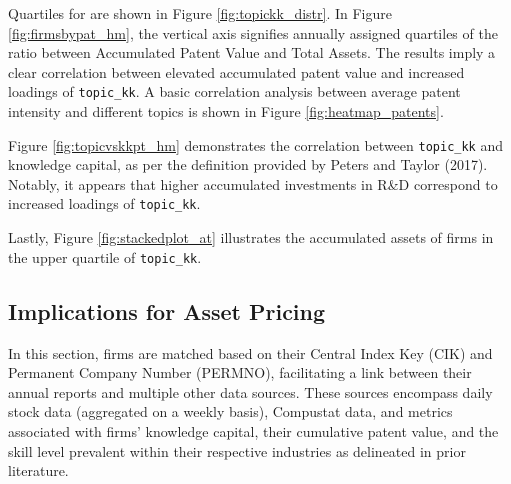 \documentclass[12pt, letterpaper]{article}
\begin{document}
 Quartiles for \tkk are shown in Figure \ref{fig:topickk_distr}. In Figure \ref{fig:firmsbypat_hm}, the vertical axis signifies annually assigned quartiles of the ratio between Accumulated Patent Value and Total Assets. The results imply a clear correlation between elevated accumulated patent value and increased loadings of \texttt{topic\_kk}. A basic correlation analysis between average patent intensity and different topics is shown in Figure \ref{fig:heatmap_patents}.




Figure \ref{fig:topicvskkpt_hm} demonstrates the correlation between \texttt{topic\_kk} and knowledge capital, as per the definition provided by Peters and Taylor (2017). Notably, it appears that higher accumulated investments in R\&D correspond to increased loadings of \texttt{topic\_kk}. 


Lastly, Figure \ref{fig:stackedplot_at} illustrates the accumulated assets of firms in the upper quartile of \texttt{topic\_kk}.


\subsection{Implications for Asset Pricing}

In this section, firms are matched based on their Central Index Key (CIK) and Permanent Company Number (PERMNO), facilitating a link between their annual reports and multiple other data sources. These sources encompass daily stock data (aggregated on a weekly basis), Compustat data, and metrics associated with firms' knowledge capital, their cumulative patent value, and the skill level prevalent within their respective industries as delineated in prior literature.
\end{document}
